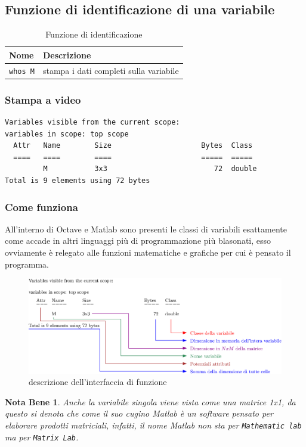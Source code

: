 \documentclass{book}
\newtheorem{notab}{Nota Bene}[section]
\begin{document}
\subsection{Funzione di identificazione di una variabile}
\label{sec:funiden}
\begin{table}[ht]
  \centering
  \begin{tabular}[tab:funzionediid]{ll}
    {\bf Nome} & {\bf Descrizione} \\\hline
    \lstinline|whos M| & stampa i dati completi sulla variabile
  \end{tabular}
  \caption{Funzione di identificazione}
  \label{tab:funzionediid}
\end{table}
\subsubsection{Stampa a video}
\label{sec:stampiden}
\begin{small}
\begin{verbatim}
Variables visible from the current scope:
variables in scope: top scope
  Attr   Name        Size                     Bytes  Class
  ====   ====        ====                     =====  =====
         M           3x3                         72  double
Total is 9 elements using 72 bytes
\end{verbatim}
\end{small}
\clearpage

\subsubsection{Come funziona}
All'interno di Octave e Matlab sono presenti le classi di variabili
esattamente come accade in altri linguaggi più di programmazione più blasonati,
esso ovviamente è relegato alle funzioni matematiche e grafiche per cui è
pensato il programma.
\begin{figure}[ht]
  \centering
  \includegraphics[width=15cm]{img/finiti/whos.eps}
  \caption{descrizione dell'interfaccia di funzione}
  \label{fig:interffun}
\end{figure}
\begin{notab}
  Anche la variabile singola viene vista come una matrice 1x1, da questo si
  denota che come il suo cugino Matlab è un software pensato per elaborare
  prodotti matriciali, infatti, il nome Matlab non sta per \texttt{Mathematic
    lab} ma per \texttt{Matrix Lab}. 
\end{notab}
\end{document}
